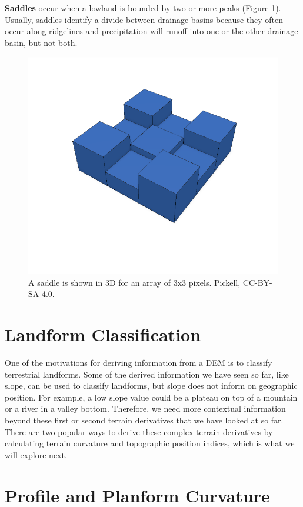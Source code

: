 \documentclass[
]{book}
\begin{document}
\textbf{Saddles} occur when a lowland is bounded by two or more peaks (Figure \ref{fig:9-saddle}). Usually, saddles identify a divide between drainage basins because they often occur along ridgelines and precipitation will runoff into one or the other drainage basin, but not both.

\begin{figure}
\includegraphics[width=0.75\linewidth]{images/09-saddle} \caption{A saddle is shown in 3D for an array of 3x3 pixels. Pickell, CC-BY-SA-4.0.}\label{fig:9-saddle}
\end{figure}

\section{Landform Classification}\label{landform-classification}

One of the motivations for deriving information from a DEM is to classify terrestrial landforms. Some of the derived information we have seen so far, like slope, can be used to classify landforms, but slope does not inform on geographic position. For example, a low slope value could be a plateau on top of a mountain or a river in a valley bottom. Therefore, we need more contextual information beyond these first or second terrain derivatives that we have looked at so far. There are two popular ways to derive these complex terrain derivatives by calculating terrain curvature and topographic position indices, which is what we will explore next.

\section{Profile and Planform Curvature}\label{profile-and-planform-curvature}
\end{document}

